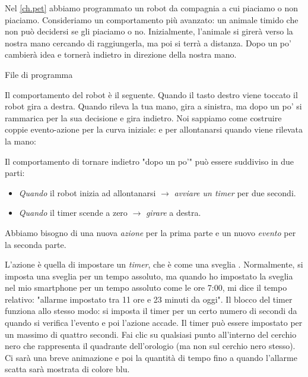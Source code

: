 \label{ch.time}

Nel \cref{ch.pet} abbiamo programmato un robot da compagnia a cui piaciamo o non piaciamo.
Consideriamo un comportamento più avanzato: un animale timido che
non può decidersi se gli piaciamo o no. Inizialmente,
l'animale si girerà verso la nostra mano cercando di raggiungerla, ma poi si terrà a distanza. Dopo un po'
cambierà idea e tornerà indietro in direzione
della nostra mano.

{\raggedleft \hfill File di programma }

Il comportamento del robot è il seguente. Quando il tasto destro viene toccato il robot gira a destra. Quando rileva la tua mano,
gira a sinistra, ma dopo un po' si rammarica per la sua decisione e gira
indietro. Noi sappiamo come costruire coppie evento-azione per la curva iniziale:
 e per allontanarsi quando viene rilevata la mano:

Il comportamento di tornare indietro "dopo un po'" può essere suddiviso in
due parti:

\begin{itemize}

\item \emph{Quando}  il robot inizia ad allontanarsi $\rightarrow$
\emph{avviare un timer} per due secondi.

\item \emph{Quando}  il timer scende a zero $\rightarrow$ \emph{girare}
a destra.

\end{itemize}

Abbiamo bisogno di una nuova \emph{azione} per la prima parte e un nuovo
\emph{evento} per la seconda parte.

L'azione è quella di impostare un \emph{timer}, che è come una sveglia
. Normalmente, si imposta una sveglia per un tempo assoluto,
ma quando ho impostato la sveglia nel mio smartphone per un tempo assoluto come le ore
7:00, mi dice il tempo relativo: "allarme impostato tra 11 ore e 23
minuti da oggi". Il blocco del timer funziona allo stesso modo: si imposta il
timer per un certo numero di secondi da quando si verifica l'evento e poi l'azione accade. Il timer può essere impostato per un massimo di quattro secondi. Fai clic su
qualsiasi punto all'interno del cerchio nero che rappresenta il quadrante dell'orologio (ma non
sul cerchio nero stesso). Ci sarà una breve animazione e poi
la quantità di tempo fino a quando l'allarme scatta sarà mostrata di colore blu.

